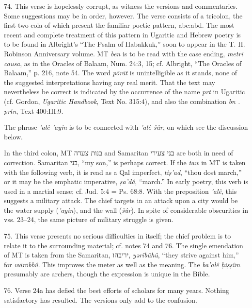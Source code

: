 \begin{enumerate}
74. This verse is hopelessly corrupt, as witness the versions and commentaries.
Some suggestions may be in order, however. The verse consists of a tricolon,
the first two cola of which present the familiar poetic pattern, abc:abd. The
most recent and complete treatment of this pattern in Ugaritic and Hebrew
poetry is to be found in Albright's ``The Psalm of Habakkuk,'' soon to appear
in the T. H. Robinson Anniversary volume. MT \emph{ben} is to be read with the
case ending, \emph{metri causa}, as in the Oracles of Balaam, Num. 24:3, 15;
cf. Albright, ``The Oracles of Balaam,'' p. 216, note 54. The word
\emph{pōrāt} is unintelligible as it stands, none of the suggested
interpretations having any real merit. That the text may nevertheless be
correct is indicated by the occurrence of the name \emph{prt} in Ugaritic
(cf. Gordon, \emph{Ugaritic Handbook}, Text No. 315:4), and also the
combination \emph{bn . prtn}, Text 400:III:9.

The phrase \emph{'alê 'ayin} is to be connected with \emph{'alê šûr}, on
which see the discussion below.

In the third colon, MT בנות צעדה and Samaritan בני צעירי are both in need of
correction. Samaritan בני, ``my son,'' is perhaps correct. If the \emph{taw}
in MT is taken with the following verb, it is read as a Qal imperfect,
\emph{tiṣ'ad}, ``thou dost march,'' or it may be the emphatic imperative,
\emph{ṣa'dâ}, ``march.'' In early poetry, this verb is used in a martial
sense; cf. Jud. 5:4 = Ps. 68:8. With the preposition \emph{'alê}, this suggests
a military attack. The chief targets in an attack upon a city would be the
water supply (\emph{'ayin}), and the wall (\emph{šûr}). In spite of
considerable obscurities in vss. 23--24, the same picture of military struggle
is given.

75. This verse presents no serious difficulties in itself; the chief problem
is to relate it to the surrounding material; cf. notes 74 and 76. The single
emendation of MT is taken from the Samaritan, יריבהו, \emph{yərîbûhû},
``they strive against him,'' for \emph{wārōbbû}. This improves the meter as
well as the meaning. The \emph{ba'alê ḥiṣṣîm} presumably are archers, though
the expression is unique in the Bible.

76. Verse 24a has defied the best efforts of scholars for many years. Nothing
satisfactory has resulted. The versions only add to the confusion.


\end{enumerate}
